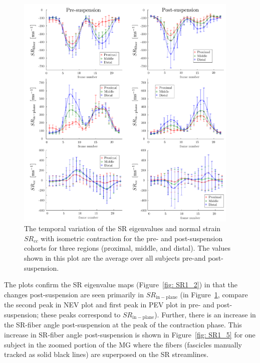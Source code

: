 \begin{figure}[!htb]
\vspace{+0.2cm}
\centering
\includegraphics[width=0.95\textwidth]{Figures/ULLS_SRfiber.pdf}
\caption[The temporal variation of the SR eigenvalues and normal strain $SR_{cc}$ with isometric contraction for the pre- and post-suspension cohorts for three regions]{The temporal variation of the SR eigenvalues and normal strain $SR_{cc}$ with isometric contraction for the pre- and post-suspension cohorts for three regions (proximal, middle, and distal). The values shown in this plot are the average over all subjects pre-and post-suspension.}
\label{fig: SR1_6}
\end{figure}
The plots confirm the SR eigenvalue maps (Figure~\ref{fig: SR1_2}) in that the changes post-suspension are seen primarily in $SR_{\mathrm{in-plane}}$ (in Figure~\ref{fig: SR1_6}, compare the second peak in NEV plot and first peak in PEV plot in pre- and post-suspension; these peaks correspond to $SR_{\mathrm{in-plane}}$). 
 Further, there is an increase in the SR-fiber angle post-suspension at the peak of the contraction phase. 
 This increase in SR-fiber angle post-suspension is shown in Figure~\ref{fig: SR1_5} for one subject in the zoomed portion of the MG where the fibers (fascicles manually tracked as solid black lines) are superposed on the SR streamlines.
